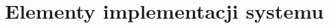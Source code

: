 \documentclass[../thesis.tex]{subfiles}
\begin{document}
\pagestyle{plain}
\chapter{Elementy implementacji systemu}
\end{document}
